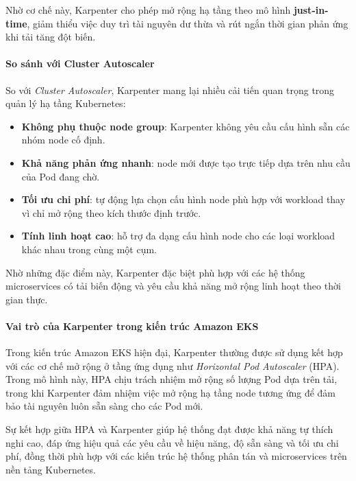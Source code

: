 Nhờ cơ chế này, Karpenter cho phép mở rộng hạ tầng theo mô hình \textbf{just-in-time}, 
giảm thiểu việc duy trì tài nguyên dư thừa và rút ngắn thời gian phản ứng khi tải tăng đột biến.

\paragraph*{So sánh với Cluster Autoscaler}

So với \textit{Cluster Autoscaler}, Karpenter mang lại nhiều cải tiến quan trọng trong 
quản lý hạ tầng Kubernetes:

\begin{itemize}
    \item \textbf{Không phụ thuộc node group}: Karpenter không yêu cầu cấu hình sẵn các nhóm node cố định.
    \item \textbf{Khả năng phản ứng nhanh}: node mới được tạo trực tiếp dựa trên nhu cầu của Pod đang chờ.
    \item \textbf{Tối ưu chi phí}: tự động lựa chọn cấu hình node phù hợp với workload thay vì chỉ mở rộng theo kích thước định trước.
    \item \textbf{Tính linh hoạt cao}: hỗ trợ đa dạng cấu hình node cho các loại workload khác nhau trong cùng một cụm.
\end{itemize}

Nhờ những đặc điểm này, Karpenter đặc biệt phù hợp với các hệ thống microservices 
có tải biến động và yêu cầu khả năng mở rộng linh hoạt theo thời gian thực.

\paragraph*{Vai trò của Karpenter trong kiến trúc Amazon EKS}

Trong kiến trúc Amazon EKS hiện đại, Karpenter thường được sử dụng kết hợp với các cơ chế 
mở rộng ở tầng ứng dụng như \textit{Horizontal Pod Autoscaler} (HPA). 
Trong mô hình này, HPA chịu trách nhiệm mở rộng số lượng Pod dựa trên tải, 
trong khi Karpenter đảm nhiệm việc mở rộng hạ tầng node tương ứng để đảm bảo 
tài nguyên luôn sẵn sàng cho các Pod mới.

Sự kết hợp giữa HPA và Karpenter giúp hệ thống đạt được khả năng tự thích nghi cao, 
đáp ứng hiệu quả các yêu cầu về hiệu năng, độ sẵn sàng và tối ưu chi phí, 
đồng thời phù hợp với các kiến trúc hệ thống phân tán và microservices trên nền tảng Kubernetes.


